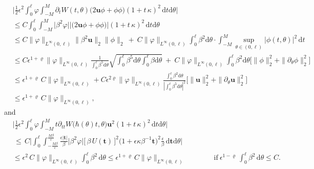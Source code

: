\documentclass[10pt, reqno]{amsart}
\numberwithin{equation}{section}
\theoremstyle{definition}
\newcommand{\e}{\epsilon}
\def\p{\partial}
\begin{document}
{{\begin{align}
 &\Bigg|\frac{1}{2}\epsilon^2\int_0^\ell \varphi \int_{-M}^{M}
 \partial_t W(t, \theta)\big(2{\mathbf u}\phi+\phi\phi\big)
 (1+t\,\kappa)^2\,{\mathrm d}t{\mathrm d}\theta
 \Bigg|
 \nonumber\\[2mm]
 &\leq C\int_0^\ell \int_{-M}^{M}
 \big|\beta^2\varphi\big|\Big| \big(2{\mathbf u}\phi+\phi\phi\big)\Big|
 (1+t\,\kappa)^2\,{\mathrm d}t{\mathrm d}\theta
 \nonumber\\[2mm]
 &\leq C \|\varphi\|_{L^\infty(0,\ell)}  \|\beta^2{\mathbf u}\|_2 \|\phi\|_2
 \ +\
 C \|\varphi\|_{L^\infty(0,\ell)}  \int_0^\ell \beta^2 {\mathrm d}\theta\cdot \int_{-M}^{M}
    \sup_{\theta \in (0,  \ell) }  |\phi (t, \theta)|^2
\,{\mathrm d}t
 \nonumber\\[2mm]
 &\leq  C  \epsilon^{1+ \varrho}   \|\varphi\|_{L^\infty(0,\ell)}\frac{1}{\displaystyle\int_0^{\ell}\beta^5 {\mathrm d}\theta} \sqrt{\int_0^{\ell} \beta^5 {\mathrm d}\theta \int_0^{\ell} \beta {\mathrm d}\theta}
 \ +\
 C \|\varphi\|_{L^\infty(0,\ell)}    \int_0^{\ell} \beta^2 {\mathrm d}\theta \Bigg[\|\phi\|_2^2+ \|\p_\theta \phi\|_2^2\Bigg]
 \nonumber\\[2mm]
 &\leq
 \epsilon^{1+\varrho}\, C \|\varphi\|_{L^\infty(0,\ell)} + C\e^{2\varrho} \|\varphi\|_{L^\infty(0,\ell)}  \frac{\displaystyle\int_0^{\ell} \beta^2 {\mathrm d}\theta}{\left| \displaystyle\int_0^{\ell}\beta^5 {\mathrm d}\theta\right|^2}  \Bigg[\|{\mathbf u}\|_2^2+ \| \p_\theta{\mathbf u}\|_2^2\Bigg]
 \nonumber\\[2mm]
 &\leq
 \epsilon^{1+\varrho}\, C \|\varphi\|_{L^\infty(0,\ell)},
 \label{FirstOrder2222}
\end{align}
and
\begin{align}
 &\Bigg|\frac{1}{2}\epsilon^2\int_0^\ell \varphi \int_{-M}^{M}
 t\partial_{tt} W\big(\hbar(\theta)t,\theta\big) {\mathbf u}^2
 (1+t\,\kappa)^2\,{\mathrm d}t{\mathrm d}\theta\Bigg|
\nonumber\\[2mm]
 &\,\leq\,
 C\Bigg|\int_0^\ell \int_{-\frac{M\beta}{\epsilon}}^{\frac{M\beta}{\epsilon}}
 \frac{\epsilon |{\mathbf t}|}{\beta}\big|\beta^2\varphi\big|
 \big[\,\beta\, U({\mathbf t})\, \big]^2\big(1+\epsilon \kappa \beta^{-1}{\mathbf t}\big)^2 \frac{\epsilon}{\beta}
 \,{\mathrm d}{\mathbf t}{\mathrm d}\theta\Bigg|
\nonumber\\[2mm]
 &\leq
 \epsilon^2\, C \|\varphi\|_{L^\infty(0,\ell)} \int_0^\ell\beta^2\,{\mathrm d}\theta
 \leq
 \epsilon^{1+\varrho}\, C \|\varphi\|_{L^\infty(0,\ell)}
 \qquad\qquad \mbox{if}\ \epsilon^{1-\varrho}\,\int_0^\ell \beta^2\,{\mathrm d}\theta\leq C.
 \label{FirstOrder3333}
\end{align}
}}
\end{document}
